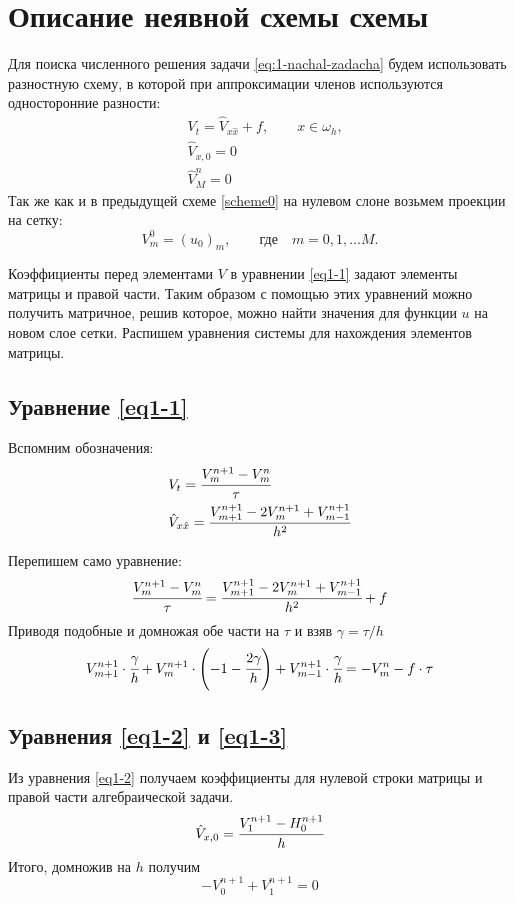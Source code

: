 \documentclass[12pt]{extarticle}
\numberwithin{equation}{section}
\begin{document}
\section{Описание неявной схемы схемы} \label{scheme}
Для поиска численного решения задачи \ref{eq:1-nachal-zadacha} будем использовать разностную схему, в которой при аппроксимации членов используются односторонние разности:
	\begin{align}
		&V_t= \hat{V}_{x \hat x} + f,\qquad x \in \omega_h, \label{eq1-1}\\
		&\hat V_{x, 0} = 0 \label{eq1-2}\\
		&{\hat V^n_M} = 0 \label{eq1-3}
	\end{align}
Так же как и в предыдущей схеме \ref{scheme0} на нулевом слоне возьмем проекции на сетку:
$$V_m^0 = (u_0)_m, \qquad \mbox{где} \quad m = 0, 1, \dots M.$$

Коэффициенты перед элементами $V$ в уравнении \ref{eq1-1} задают элементы матрицы и правой части.
Таким образом с помощью этих уравнений можно получить матричное, решив которое, можно найти значения для функции $u$ на новом слое сетки.
Распишем уравнения системы для нахождения элементов матрицы.

\subsection{Уравнение \ref{eq1-1}}
Вспомним обозначения:
\begin{align}
&V_t = \cfrac{V_m^{n+1} - V_m^n}{\tau} \label{eq2:1:1}\\
&\hat V_{x \hat x} = \cfrac{V_{m+1}^{n+1} - 2V_m^{n+1} + V_{m-1}^{n+1}}{h^2} \label{eq:2:1:2}
\end{align}

Перепишем само уравнение:
$$\cfrac{V_m^{n+1} - V_m^n}{\tau} = \cfrac{V_{m+1}^{n+1} - 2V_m^{n+1} + V_{m-1}^{n+1}}{h^2} + f
$$
Приводя подобные и домножая обе части на $\tau$ и взяв $\gamma = \tau/h$
\begin{equation}
 V_{m+1}^{n+1} \cdot \cfrac{\gamma}{h} + V_m^{n+1} \cdot \left( -1 - \cfrac{2\gamma}{h}\right) + V_{m-1}^{n+1} \cdot \cfrac{\gamma}{h} = -V_m^n - f \cdot \tau
 \label{eq2:1:final}
\end{equation}

\subsection{Уравнения \ref{eq1-2} и \ref{eq1-3}}
Из уравнения \ref{eq1-2} получаем коэффициенты для нулевой строки матрицы и правой части алгебраической задачи.
\begin{align*}
&\hat V_{x, 0} = \cfrac{V_1^{n+1} - H_0^{n+1}}{h}\\
\end{align*}
Итого, домножив на $h$ получим
\begin{equation}
-V_0^{n+1} + V_{1}^{n+1} = 0 \label{eq:2final}
\end{equation}
\end{document}
